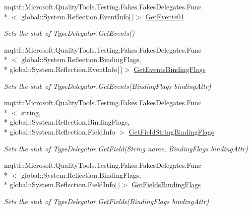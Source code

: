 \begin{DoxyCompactItemize}
mqttf\-::\-Microsoft.\-Quality\-Tools.\-Testing.\-Fakes.\-Fakes\-Delegates.\-Func\\*
$<$ global\-::\-System.\-Reflection.\-Event\-Info\mbox{[}$\,$\mbox{]}$>$ \hyperlink{class_system_1_1_reflection_1_1_fakes_1_1_stub_type_delegator_a35b4a66e45ff931f3730c3f238b6a6bd}{Get\-Events01}
\begin{DoxyCompactList}\small\item\em Sets the stub of Type\-Delegator.\-Get\-Events()\end{DoxyCompactList}\item 
mqttf\-::\-Microsoft.\-Quality\-Tools.\-Testing.\-Fakes.\-Fakes\-Delegates.\-Func\\*
$<$ global\-::\-System.\-Reflection.\-Binding\-Flags, \\*
global\-::\-System.\-Reflection.\-Event\-Info\mbox{[}$\,$\mbox{]}$>$ \hyperlink{class_system_1_1_reflection_1_1_fakes_1_1_stub_type_delegator_ab20f38607fdd618705331055d0cac157}{Get\-Events\-Binding\-Flags}
\begin{DoxyCompactList}\small\item\em Sets the stub of Type\-Delegator.\-Get\-Events(\-Binding\-Flags binding\-Attr)\end{DoxyCompactList}\item 
mqttf\-::\-Microsoft.\-Quality\-Tools.\-Testing.\-Fakes.\-Fakes\-Delegates.\-Func\\*
$<$ string, \\*
global\-::\-System.\-Reflection.\-Binding\-Flags, \\*
global\-::\-System.\-Reflection.\-Field\-Info $>$ \hyperlink{class_system_1_1_reflection_1_1_fakes_1_1_stub_type_delegator_a5c70625379665ddd924af16fcedc40ac}{Get\-Field\-String\-Binding\-Flags}
\begin{DoxyCompactList}\small\item\em Sets the stub of Type\-Delegator.\-Get\-Field(\-String name, Binding\-Flags binding\-Attr)\end{DoxyCompactList}\item 
mqttf\-::\-Microsoft.\-Quality\-Tools.\-Testing.\-Fakes.\-Fakes\-Delegates.\-Func\\*
$<$ global\-::\-System.\-Reflection.\-Binding\-Flags, \\*
global\-::\-System.\-Reflection.\-Field\-Info\mbox{[}$\,$\mbox{]}$>$ \hyperlink{class_system_1_1_reflection_1_1_fakes_1_1_stub_type_delegator_acdb3580a18abb1deb46d59906f475b99}{Get\-Fields\-Binding\-Flags}
\begin{DoxyCompactList}\small\item\em Sets the stub of Type\-Delegator.\-Get\-Fields(\-Binding\-Flags binding\-Attr)\end{DoxyCompactList}\item 

\end{DoxyCompactItemize}
